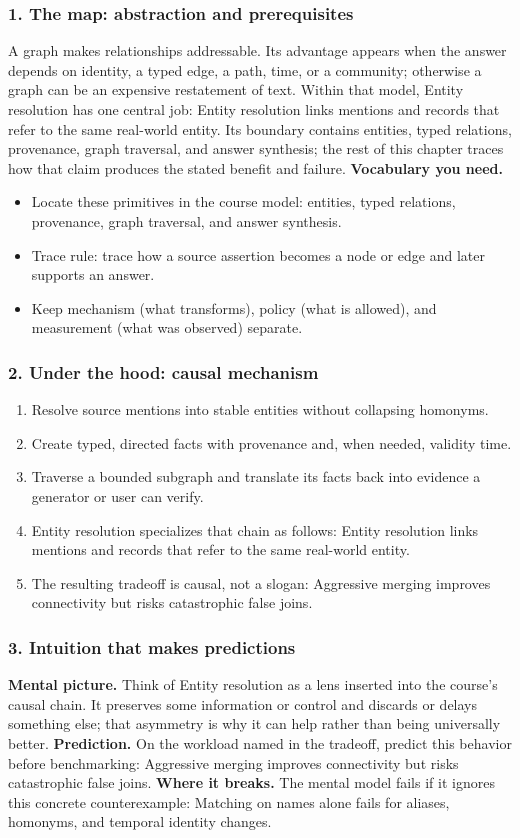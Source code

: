 \subsubsection*{1. The map: abstraction and prerequisites}
A graph makes relationships addressable. Its advantage appears when the answer depends on identity, a typed edge, a path, time, or a community; otherwise a graph can be an expensive restatement of text.
Within that model, Entity resolution has one central job: Entity resolution links mentions and records that refer to the same real-world entity. Its boundary contains entities, typed relations, provenance, graph traversal, and answer synthesis; the rest of this chapter traces how that claim produces the stated benefit and failure.
\textbf{Vocabulary you need.}\begin{itemize}
\item Locate these primitives in the course model: entities, typed relations, provenance, graph traversal, and answer synthesis.
\item Trace rule: trace how a source assertion becomes a node or edge and later supports an answer.
\item Keep mechanism (what transforms), policy (what is allowed), and measurement (what was observed) separate.
\end{itemize}
\subsubsection*{2. Under the hood: causal mechanism}\begin{enumerate}
\item Resolve source mentions into stable entities without collapsing homonyms.
\item Create typed, directed facts with provenance and, when needed, validity time.
\item Traverse a bounded subgraph and translate its facts back into evidence a generator or user can verify.
\item Entity resolution specializes that chain as follows: Entity resolution links mentions and records that refer to the same real-world entity.
\item The resulting tradeoff is causal, not a slogan: Aggressive merging improves connectivity but risks catastrophic false joins.
\end{enumerate}
\subsubsection*{3. Intuition that makes predictions}
\textbf{Mental picture.} Think of Entity resolution as a lens inserted into the course's causal chain. It preserves some information or control and discards or delays something else; that asymmetry is why it can help rather than being universally better.
\textbf{Prediction.} On the workload named in the tradeoff, predict this behavior before benchmarking: Aggressive merging improves connectivity but risks catastrophic false joins.
\textbf{Where it breaks.} The mental model fails if it ignores this concrete counterexample: Matching on names alone fails for aliases, homonyms, and temporal identity changes.
